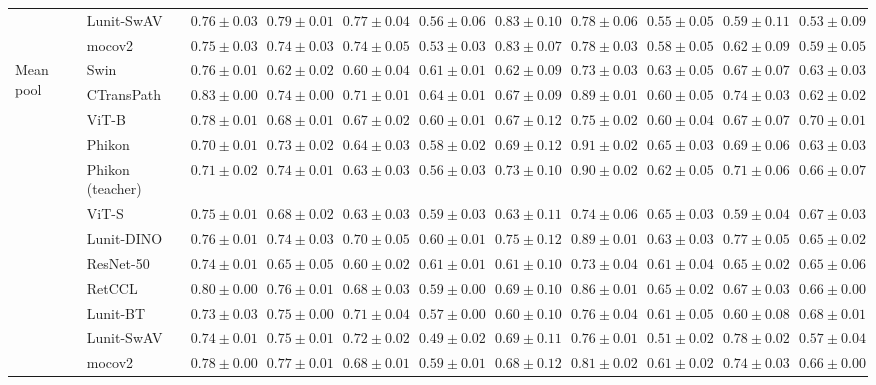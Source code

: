 \begin{tabular}{ll|cccc|c|cccc}
 & Lunit-SwAV & $0.76 \pm 0.03$ & $0.79 \pm 0.01$ & $0.77 \pm 0.04$ & $0.56 \pm 0.06$ & $0.83 \pm 0.10$ & $0.78 \pm 0.06$ & $0.55 \pm 0.05$ & $0.59 \pm 0.11$ & $0.53 \pm 0.09$ \\
 & mocov2 & $0.75 \pm 0.03$ & $0.74 \pm 0.03$ & $0.74 \pm 0.05$ & $0.53 \pm 0.03$ & $0.83 \pm 0.07$ & $0.78 \pm 0.03$ & $0.58 \pm 0.05$ & $0.62 \pm 0.09$ & $0.59 \pm 0.05$ \\
\cline{1-11}
\multirow[t]{12}{*}{Mean pool} & Swin & $0.76 \pm 0.01$ & $0.62 \pm 0.02$ & $0.60 \pm 0.04$ & $0.61 \pm 0.01$ & $0.62 \pm 0.09$ & $0.73 \pm 0.03$ & $0.63 \pm 0.05$ & $0.67 \pm 0.07$ & $0.63 \pm 0.03$ \\
 & CTransPath & $\mathbf{0.83 \pm 0.00}$ & $0.74 \pm 0.00$ & $0.71 \pm 0.01$ & $\mathbf{0.64 \pm 0.01}$ & $0.67 \pm 0.09$ & $0.89 \pm 0.01$ & $0.60 \pm 0.05$ & $0.74 \pm 0.03$ & $0.62 \pm 0.02$ \\
 & ViT-B & $0.78 \pm 0.01$ & $0.68 \pm 0.01$ & $0.67 \pm 0.02$ & $0.60 \pm 0.01$ & $0.67 \pm 0.12$ & $0.75 \pm 0.02$ & $0.60 \pm 0.04$ & $0.67 \pm 0.07$ & $\mathbf{0.70 \pm 0.01}$ \\
 & Phikon & $0.70 \pm 0.01$ & $0.73 \pm 0.02$ & $0.64 \pm 0.03$ & $0.58 \pm 0.02$ & $0.69 \pm 0.12$ & $\mathbf{0.91 \pm 0.02}$ & $\mathbf{0.65 \pm 0.03}$ & $0.69 \pm 0.06$ & $0.63 \pm 0.03$ \\
 & Phikon (teacher) & $0.71 \pm 0.02$ & $0.74 \pm 0.01$ & $0.63 \pm 0.03$ & $0.56 \pm 0.03$ & $0.73 \pm 0.10$ & $0.90 \pm 0.02$ & $0.62 \pm 0.05$ & $0.71 \pm 0.06$ & $0.66 \pm 0.07$ \\
 & ViT-S & $0.75 \pm 0.01$ & $0.68 \pm 0.02$ & $0.63 \pm 0.03$ & $0.59 \pm 0.03$ & $0.63 \pm 0.11$ & $0.74 \pm 0.06$ & $0.65 \pm 0.03$ & $0.59 \pm 0.04$ & $0.67 \pm 0.03$ \\
 & Lunit-DINO & $0.76 \pm 0.01$ & $0.74 \pm 0.03$ & $0.70 \pm 0.05$ & $0.60 \pm 0.01$ & $\mathbf{0.75 \pm 0.12}$ & $0.89 \pm 0.01$ & $0.63 \pm 0.03$ & $0.77 \pm 0.05$ & $0.65 \pm 0.02$ \\
 & ResNet-50 & $0.74 \pm 0.01$ & $0.65 \pm 0.05$ & $0.60 \pm 0.02$ & $0.61 \pm 0.01$ & $0.61 \pm 0.10$ & $0.73 \pm 0.04$ & $0.61 \pm 0.04$ & $0.65 \pm 0.02$ & $0.65 \pm 0.06$ \\
 & RetCCL & $0.80 \pm 0.00$ & $0.76 \pm 0.01$ & $0.68 \pm 0.03$ & $0.59 \pm 0.00$ & $0.69 \pm 0.10$ & $0.86 \pm 0.01$ & $0.65 \pm 0.02$ & $0.67 \pm 0.03$ & $0.66 \pm 0.00$ \\
 & Lunit-BT & $0.73 \pm 0.03$ & $0.75 \pm 0.00$ & $0.71 \pm 0.04$ & $0.57 \pm 0.00$ & $0.60 \pm 0.10$ & $0.76 \pm 0.04$ & $0.61 \pm 0.05$ & $0.60 \pm 0.08$ & $0.68 \pm 0.01$ \\
 & Lunit-SwAV & $0.74 \pm 0.01$ & $0.75 \pm 0.01$ & $\mathbf{0.72 \pm 0.02}$ & $0.49 \pm 0.02$ & $0.69 \pm 0.11$ & $0.76 \pm 0.01$ & $0.51 \pm 0.02$ & $\mathbf{0.78 \pm 0.02}$ & $0.57 \pm 0.04$ \\
 & mocov2 & $0.78 \pm 0.00$ & $\mathbf{0.77 \pm 0.01}$ & $0.68 \pm 0.01$ & $0.59 \pm 0.01$ & $0.68 \pm 0.12$ & $0.81 \pm 0.02$ & $0.61 \pm 0.02$ & $0.74 \pm 0.03$ & $0.66 \pm 0.00$ \\
\cline{1-11}
\bottomrule
\end{tabular}
